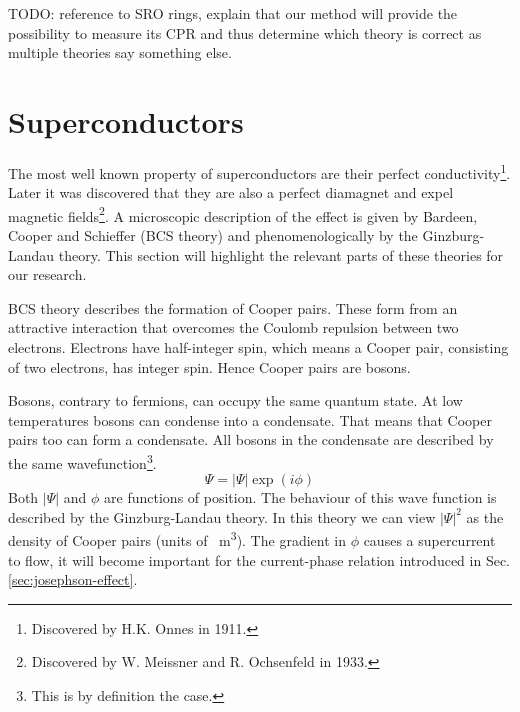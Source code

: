 TODO: reference to SRO rings, explain that our method will provide the possibility to measure its CPR and thus determine which theory is correct as multiple theories say something else.

\section{Superconductors}
The most well known property of superconductors are their perfect conductivity\footnote{Discovered by H.K. Onnes in 1911.}. Later it was discovered that they are also a perfect diamagnet and expel magnetic fields\footnote{Discovered by W. Meissner and R. Ochsenfeld in 1933.}. A microscopic description of the effect is given by Bardeen, Cooper and Schieffer (BCS theory) and phenomenologically by the Ginzburg-Landau theory\cite{tinkhamIntroductionSuperconductivity}. This section will highlight the relevant parts of these theories for our research.

BCS theory describes the formation of Cooper pairs. These form from an attractive interaction that overcomes the Coulomb repulsion between two electrons\cite{bardeenTheorySuperconductivity1957}. Electrons have half-integer spin, which means a Cooper pair, consisting of two electrons, has integer spin. Hence Cooper pairs are bosons.

Bosons, contrary to fermions, can occupy the same quantum state. At low temperatures bosons can condense into a condensate. That  means that Cooper pairs too can form a condensate. All bosons in the condensate are described by the same wavefunction\footnote{This is by definition the case.}.
\begin{equation}
	\Psi = \left|\Psi\right| \exp(i\phi)
	\label{eqn:GL-wavefunction}
\end{equation}
Both $\left|\Psi\right|$ and $\phi$ are functions of position. The behaviour of this wave function is described by the Ginzburg-Landau theory. In this theory we can view $|\Psi|^2$ as the density of Cooper pairs (units of \unit{\per\cubic\meter}). The gradient in $\phi$ causes a supercurrent to flow, it will become important for the current-phase relation introduced in Sec. \ref{sec:josephson-effect}.

